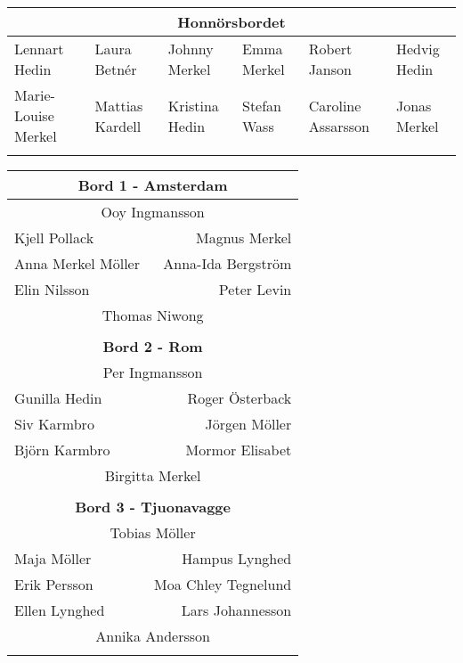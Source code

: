 \documentclass[a5paper]{article}
\begin{document}
	\thispagestyle{empty}

	\begingroup
	\fontsize{10pt}{10.3pt}\selectfont

	\begin{landscape}
		
\begin{center}											
	\begin{tabular}{  l l l l l l}											
		\multicolumn{6}{c}{\textbf{Honnörsbordet}} \\ \hline											
		Lennart Hedin	&	Laura Betnér	&	Johnny Merkel	&	Emma Merkel	&	Robert Janson	&	Hedvig Hedin	\\
		Marie-Louise Merkel	&	Mattias Kardell	&	Kristina Hedin	&	Stefan Wass	&	Caroline Assarsson	&	Jonas Merkel	\\ 
		\\ \hline
	\end{tabular}											
\end{center}											

\begin{center}							
	\begin{tabular}{  l r }			
		\multicolumn{2}{c}{\textbf{		Bord 1 - Amsterdam	}} \\ \hline
		\multicolumn{2}{c}{	Ooy Ingmansson		}   \\
		Kjell Pollack	&	Magnus Merkel	\\
		Anna Merkel Möller	&	Anna-Ida Bergström	\\
		Elin Nilsson	&	Peter Levin	\\
		\multicolumn{2}{c}{	Thomas Niwong		}   \\
		\\
		
		\multicolumn{2}{c}{\textbf{		Bord 2 - Rom	}} \\ \hline
		\multicolumn{2}{c}{	Per Ingmansson		}   \\
		Gunilla Hedin	&	Roger Österback	\\
		Siv Karmbro	&	Jörgen Möller	\\
		Björn Karmbro	&	Mormor Elisabet	\\
		\multicolumn{2}{c}{	Birgitta Merkel		}   \\
		\\
		
		\multicolumn{2}{c}{\textbf{		Bord 3 - Tjuonavagge	}} \\ \hline
		\multicolumn{2}{c}{	Tobias Möller		}   \\
		Maja Möller	&	Hampus Lynghed	\\
		Erik Persson	&	Moa Chley Tegnelund	\\
		Ellen Lynghed	&	Lars Johannesson	\\
		\multicolumn{2}{c}{	Annika Andersson		}   \\
		\\
		

\end{tabular}
\end{center}
\end{landscape}
\end{document}

